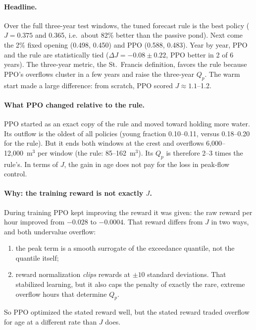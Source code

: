 \paragraph{Headline.} Over the full three-year test windows, the tuned
forecast rule is the best policy ($J=0.375$ and 0.365, i.e.\ about 82\%
better than the passive pond). Next come the 2\% fixed opening (0.498,
0.450) and PPO (0.588, 0.483). Year by year, PPO and the rule are
statistically tied ($\Delta J=-0.08\pm0.22$, PPO better in 2 of 6 years).
The three-year metric, the St.~Francis definition, favors the rule because
PPO's overflows cluster in a few years and raise the three-year $Q_p$.
The warm start made a large difference: from scratch, PPO scored
$J\approx1.1$--1.2.

\paragraph{What PPO changed relative to the rule.} PPO started as an exact
copy of the rule and moved toward holding more water. Its outflow is the
oldest of all policies (young fraction 0.10--0.11, versus 0.18--0.20 for
the rule). But it ends both windows at the crest and overflows
6{,}000--12{,}000~m$^3$ per window (the rule: 85--162~m$^3$). Its $Q_p$ is
therefore 2--3 times the rule's. In terms of $J$, the gain in age does not
pay for the loss in peak-flow control.

\paragraph{Why: the training reward is not exactly $J$.} During training
PPO kept improving the reward it was given: the raw reward per hour
improved from $-0.028$ to $-0.0004$. That reward differs from $J$ in two
ways, and both undervalue overflow:
\begin{enumerate}\itemsep1pt
\item the peak term is a smooth surrogate of the exceedance quantile, not
the quantile itself;
\item reward normalization \emph{clips} rewards at $\pm10$ standard
deviations. That stabilized learning, but it also caps the penalty of
exactly the rare, extreme overflow hours that determine $Q_p$.
\end{enumerate}
So PPO optimized the stated reward well, but the stated reward traded
overflow for age at a different rate than $J$ does.

